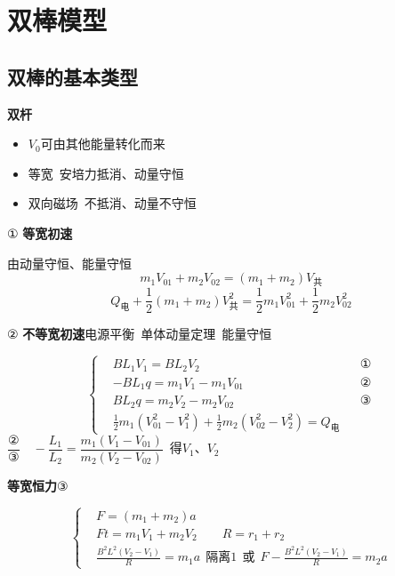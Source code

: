 \section{双棒模型}
\subsection{双棒的基本类型}
\textbf{双杆}

\begin{itemize}
\item $V_0$可由其他能量转化而来
\item 等宽\ 安培力抵消、动量守恒
\item 双向磁场\ 不抵消、动量不守恒
\end{itemize}

① \textbf{等宽初速}


由动量守恒、能量守恒
\[
m_1V_{01}+m_2V_{02}=(m_1+m_2)V_{\text{共}}
\]
\[
Q_{\text{电}}+\frac12(m_1+m_2)V_{\text{共}}^2=\frac12m_1V_{01}^2+\frac12m_2V_{02}^2
\]


② \textbf{不等宽初速}\quad \textbar 电源平衡\textbar\ 单体动量定理\ \textbar 能量守恒\textbar


\[
\left\{\begin{aligned}
&BL_1V_1=BL_2V_2 && \text{①}\\
&-BL_1q=m_1V_1-m_1V_{01} && \text{②}\\
&BL_2q=m_2V_2-m_2V_{02} && \text{③}\\
&\tfrac12m_1(V_{01}^2-V_1^2)+\tfrac12m_2(V_{02}^2-V_2^2)=Q_{\text{电}}
\end{aligned}\right.
\]
$\dfrac{\text{②}}{\text{③}}\quad -\dfrac{L_1}{L_2}=\dfrac{m_1(V_1-V_{01})}{m_2(V_2-V_{02})}$\ 得$V_1$、$V_2$


\textbf{等宽恒力}\quad ③


\[
\left\{\begin{aligned}
&F=(m_1+m_2)a\\
&Ft=m_1V_1+m_2V_2\qquad R=r_1+r_2\\
&\frac{B^2L^2(V_2-V_1)}{R}=m_1a\ \ \text{隔离1}\ \ \text{或}\ \ F-\frac{B^2L^2(V_2-V_1)}{R}=m_2a
\end{aligned}\right.
\]

